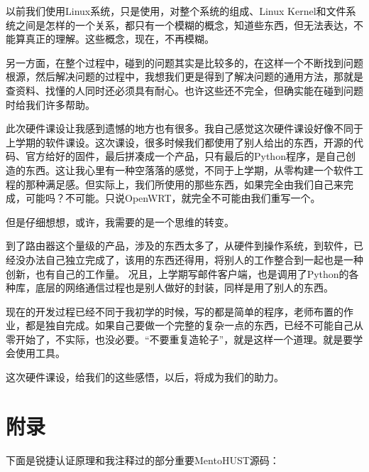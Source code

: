 \documentclass{itecreport-zh}
\begin{document}
以前我们使用Linux系统，只是使用，对整个系统的组成、Linux Kernel和文件系统之间是怎样的一个关系，都只有一个模糊的概念，知道些东西，但无法表达，不能算真正的理解。这些概念，现在，不再模糊。


另一方面，在整个过程中，碰到的问题其实是比较多的，在这样一个不断找到问题根源，然后解决问题的过程中，我想我们更是得到了解决问题的通用方法，那就是查资料、找懂的人同时还必须具有耐心。也许这些还不完全，但确实能在碰到问题时给我们许多帮助。


此次硬件课设让我感到遗憾的地方也有很多。我自己感觉这次硬件课设好像不同于上学期的软件课设。这次课设，很多时候我们都使用了别人给出的东西，开源的代码、官方给好的固件，最后拼凑成一个产品，只有最后的Python程序，是自己创造的东西。这让我心里有一种空落落的感觉，不同于上学期，从零构建一个软件工程的那种满足感。但实际上，我们所使用的那些东西，如果完全由我们自己来完成，可能吗？不可能。只说OpenWRT，就完全不可能由我们重写一个。


但是仔细想想，或许，我需要的是一个思维的转变。


到了路由器这个量级的产品，涉及的东西太多了，从硬件到操作系统，到软件，已经没办法自己独立完成了，该用的东西还得用，将别人的工作整合到一起也是一种创新，也有自己的工作量。
况且，上学期写邮件客户端，也是调用了Python的各种库，底层的网络通信过程也是别人做好的封装，同样是用了别人的东西。


现在的开发过程已经不同于我初学的时候，写的都是简单的程序，老师布置的作业，都是独自完成。如果自己要做一个完整的复杂一点的东西，已经不可能自己从零开始了，不实际，也没必要。“不要重复造轮子”，就是这样一个道理。就是要学会使用工具。


这次硬件课设，给我们的这些感悟，以后，将成为我们的助力。

\chapter{附录}

下面是锐捷认证原理和我注释过的部分重要MentoHUST源码：
\end{document}
